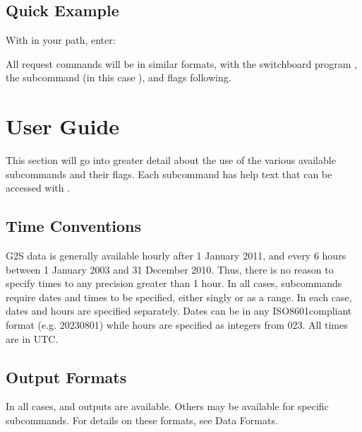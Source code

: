 \documentclass[letterpaper,10pt,english]{sphinxmanual}
\begin{document}
\section{Quick Example}
\label{\detokenize{overview:quick-example}}
\sphinxAtStartPar
With  in your path, enter:

\sphinxAtStartPar
{}

\sphinxAtStartPar
All request commands will be in similar formats, with the switchboard program , the subcommand (in this case ), and flags following.


\chapter{User Guide}
\label{\detokenize{userguide:user-guide}}\label{\detokenize{userguide:userguide}}\label{\detokenize{userguide::doc}}
\sphinxAtStartPar
This section will go into greater detail about the use of the various available subcommands and their flags.  Each subcommand has help text that can be accessed with .


\section{Time Conventions}
\label{\detokenize{userguide:time-conventions}}
\sphinxAtStartPar
G2S data is generally available hourly after 1 January 2011, and every 6 hours between 1 January 2003 and 31 December 2010.  Thus, there is no reason to specify times to any precision greater than 1 hour.  In all cases, subcommands require dates and times to be specified, either singly or as a range.  In each case, dates and hours are specified separately.  Dates can be in any ISO8601\sphinxhyphen{}compliant format (e.g. 2023\sphinxhyphen{}08\sphinxhyphen{}01) while hours are specified as integers from 0\sphinxhyphen{}23.  All times are in UTC.


\section{Output Formats}
\label{\detokenize{userguide:output-formats}}
\sphinxAtStartPar
In all cases,  and  outputs are available.  Others may be available for specific subcommands.  For details on these formats, see Data Formats.
\end{document}
